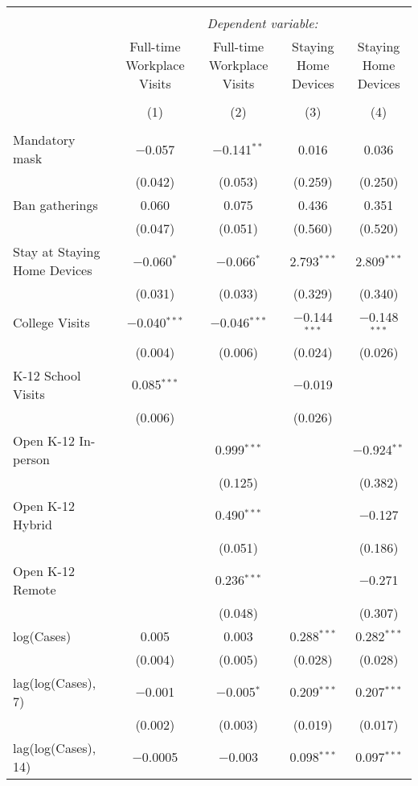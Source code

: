 \begin{tabular}{@{\extracolsep{1pt}}lcccc} 
\\[-1.8ex]\hline 
\hline \\[-1.8ex] 
 & \multicolumn{4}{c}{\textit{Dependent variable:}} \\ 
\cline{2-5} 
 & Full-time Workplace Visits & Full-time Workplace Visits & Staying Home Devices & Staying Home Devices \\ 
\\[-1.8ex] & (1) & (2) & (3) & (4)\\ 
\hline \\[-1.8ex] 
 Mandatory mask & $-$0.057 & $-$0.141$^{**}$ & 0.016 & 0.036 \\ 
  & (0.042) & (0.053) & (0.259) & (0.250) \\ 
  Ban gatherings & 0.060 & 0.075 & 0.436 & 0.351 \\ 
  & (0.047) & (0.051) & (0.560) & (0.520) \\ 
  Stay at Staying Home Devices & $-$0.060$^{*}$ & $-$0.066$^{*}$ & 2.793$^{***}$ & 2.809$^{***}$ \\ 
  & (0.031) & (0.033) & (0.329) & (0.340) \\ 
  College Visits & $-$0.040$^{***}$ & $-$0.046$^{***}$ & $-$0.144$^{***}$ & $-$0.148$^{***}$ \\ 
  & (0.004) & (0.006) & (0.024) & (0.026) \\ 
  K-12 School Visits & 0.085$^{***}$ &  & $-$0.019 &  \\ 
  & (0.006) &  & (0.026) &  \\ 
  Open K-12 In-person &  & 0.999$^{***}$ &  & $-$0.924$^{**}$ \\ 
  &  & (0.125) &  & (0.382) \\ 
  Open K-12 Hybrid &  & 0.490$^{***}$ &  & $-$0.127 \\ 
  &  & (0.051) &  & (0.186) \\ 
  Open K-12 Remote &  & 0.236$^{***}$ &  & $-$0.271 \\ 
  &  & (0.048) &  & (0.307) \\ 
  log(Cases) & 0.005 & 0.003 & 0.288$^{***}$ & 0.282$^{***}$ \\ 
  & (0.004) & (0.005) & (0.028) & (0.028) \\ 
  lag(log(Cases), 7) & $-$0.001 & $-$0.005$^{*}$ & 0.209$^{***}$ & 0.207$^{***}$ \\ 
  & (0.002) & (0.003) & (0.019) & (0.017) \\ 
  lag(log(Cases), 14) & $-$0.0005 & $-$0.003 & 0.098$^{***}$ & 0.097$^{***}$ \\ 

\end{tabular}

